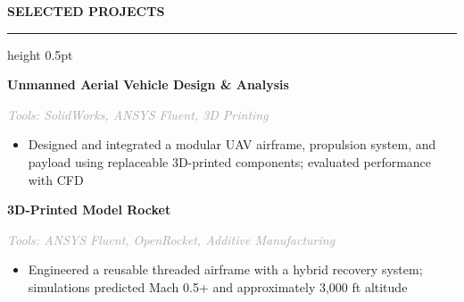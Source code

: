 \documentclass[10pt,letterpaper]{article}
\renewcommand{\section}[1]{
    \vspace{5pt}
    {\normalsize\bfseries\textcolor{navyblue}{\MakeUppercase{#1}}}
    \vspace{0pt}
    
    {\color{navyblue}\hrule height 0.5pt}
    \vspace{3pt}
}
\newcommand{\projectEntry}[1]{
    \textbf{#1}
    \vspace{0pt}
}
\begin{document}
\vspace{1pt}

\section{Selected Projects}

\projectEntry{Unmanned Aerial Vehicle Design \& Analysis}

{\small \textit{\textcolor{darkgray}{Tools: SolidWorks, ANSYS Fluent, 3D Printing}}}
\begin{itemize}
    \item Designed and integrated a modular UAV airframe, propulsion system, and payload using replaceable 3D-printed components; evaluated performance with CFD
\end{itemize}

\vspace{1pt}

\projectEntry{3D-Printed Model Rocket}

{\small \textit{\textcolor{darkgray}{Tools: ANSYS Fluent, OpenRocket, Additive Manufacturing}}}
\begin{itemize}
    \item Engineered a reusable threaded airframe with a hybrid recovery system; simulations predicted Mach 0.5+ and approximately 3,000 ft altitude
\end{itemize}
\end{document}

